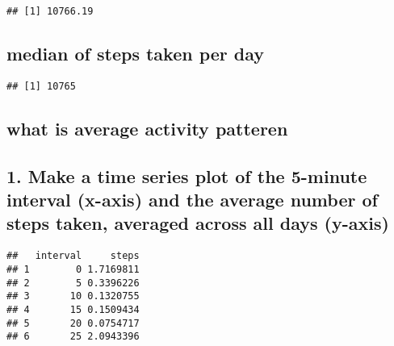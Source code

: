 \documentclass[]{article}
\newenvironment{Shaded}{\begin{snugshade}}{\end{snugshade}}
\newcommand{\KeywordTok}[1]{\textcolor[rgb]{0.13,0.29,0.53}{\textbf{#1}}}
\newcommand{\DataTypeTok}[1]{\textcolor[rgb]{0.13,0.29,0.53}{#1}}
\newcommand{\DecValTok}[1]{\textcolor[rgb]{0.00,0.00,0.81}{#1}}
\newcommand{\StringTok}[1]{\textcolor[rgb]{0.31,0.60,0.02}{#1}}
\newcommand{\OtherTok}[1]{\textcolor[rgb]{0.56,0.35,0.01}{#1}}
\newcommand{\OperatorTok}[1]{\textcolor[rgb]{0.81,0.36,0.00}{\textbf{#1}}}
\newcommand{\NormalTok}[1]{#1}
\begin{document}
\begin{verbatim}
## [1] 10766.19
\end{verbatim}

\subsection{median of steps taken per
day}\label{median-of-steps-taken-per-day}

\begin{Shaded}
\end{Shaded}

\begin{verbatim}
## [1] 10765
\end{verbatim}

\subsection{what is average activity
patteren}\label{what-is-average-activity-patteren}

\subsection{1. Make a time series plot of the 5-minute interval (x-axis)
and the average number of steps taken, averaged across all days
(y-axis)}\label{make-a-time-series-plot-of-the-5-minute-interval-x-axis-and-the-average-number-of-steps-taken-averaged-across-all-days-y-axis}

\begin{Shaded}
\end{Shaded}

\begin{verbatim}
##   interval     steps
## 1        0 1.7169811
## 2        5 0.3396226
## 3       10 0.1320755
## 4       15 0.1509434
## 5       20 0.0754717
## 6       25 2.0943396
\end{verbatim}
\end{document}
